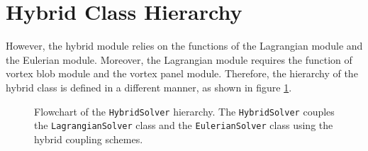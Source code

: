 \section{Hybrid Class Hierarchy}

However, the hybrid module relies on the functions of the Lagrangian module and the Eulerian module. Moreover, the Lagrangian module requires the function of vortex blob module and the vortex panel module. Therefore, the hierarchy of the hybrid class is defined in a different manner, as shown in figure \ref{fig:tikz_hybridStructure}. 

\begin{figure}[h]
\centering
{}
\caption{Flowchart of the \texttt{HybridSolver} hierarchy. The \texttt{HybridSolver} couples the \texttt{LagrangianSolver} class and the \texttt{EulerianSolver} class using the hybrid coupling schemes.}
\label{fig:tikz_hybridStructure}
\end{figure}

